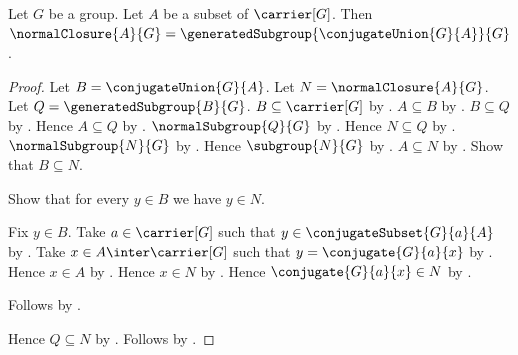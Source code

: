 \begin{theorem}\label{normal_closure_is_generated_by_conjugates}
    Let $G$ be a group.
    Let $A$ be a subset of $\carrier[G]$.
    Then
        $\normalClosure{A}{G}=
            \generatedSubgroup{\conjugateUnion{G}{A}}{G}$.
\end{theorem}
\begin{proof}
    Let $B=\conjugateUnion{G}{A}$.
    Let $N=\normalClosure{A}{G}$.
    Let $Q=\generatedSubgroup{B}{G}$.
    $B\subseteq\carrier[G]$ by
        .
    $A\subseteq B$ by
        .
    $B\subseteq Q$ by
        .
    Hence $A\subseteq Q$ by .
    $\normalSubgroup{Q}{G}$ by
        .
    Hence $N\subseteq Q$ by .
    $\normalSubgroup{N}{G}$ by
        .
    Hence $\subgroup{N}{G}$ by
        .
    $A\subseteq N$ by
        .
    Show that $B\subseteq N$.
    \begin{subproof}
        Show that for every $y\in B$ we have $y\in N$.
        \begin{subproof}
            Fix $y\in B$.
            Take $a\in\carrier[G]$ such that
                $y\in\conjugateSubset{G}{a}{A}$ by
                .
            Take $x\in A\inter\carrier[G]$ such that
                $y=\conjugate{G}{a}{x}$ by
                .
            Hence $x\in A$ by .
            Hence $x\in N$ by .
            Hence $\conjugate{G}{a}{x}\in N$ by
                .
        \end{subproof}
        Follows by .
    \end{subproof}
    Hence $Q\subseteq N$ by
        .
    Follows by .
\end{proof}
